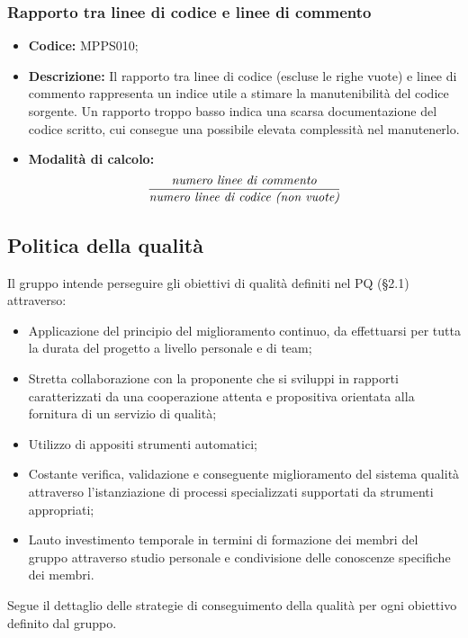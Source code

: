 \documentclass[../NormediProgetto.tex]{subfiles}
\begin{document}
\subsubsection{Rapporto tra linee di codice e linee di commento}

\begin{itemize}
	
	\item \textbf{Codice:} MPPS010;
	
	\item \textbf{Descrizione:} Il rapporto tra linee di codice (escluse le righe vuote) e linee di commento rappresenta un indice utile a stimare la manutenibilità del codice sorgente. Un rapporto troppo basso indica una scarsa documentazione del codice scritto, cui consegue una possibile elevata complessità nel manutenerlo.
	
	\item \textbf{Modalità di calcolo:}
	\[\frac{\textrm{\textit{numero linee di commento}}}{\textrm{\textit{numero linee di codice (non vuote)}}} \]
\end{itemize}

\subsection{Politica della qualità}
Il gruppo intende perseguire gli obiettivi di qualità definiti nel PQ (§2.1) attraverso:

\begin{itemize}
	\item Applicazione del principio del miglioramento continuo, da effettuarsi per tutta la durata del progetto a livello personale e di team;
	\item Stretta collaborazione con la proponente che si sviluppi in rapporti caratterizzati da una cooperazione attenta e propositiva orientata alla fornitura di un servizio di qualità;
	\item Utilizzo di appositi strumenti automatici;
	\item Costante verifica, validazione e conseguente miglioramento del sistema qualità attraverso l'istanziazione di processi specializzati supportati da strumenti appropriati;
	\item Lauto investimento temporale in termini di formazione dei membri del gruppo attraverso studio personale e condivisione delle conoscenze specifiche dei membri.
\end{itemize}

Segue il dettaglio delle strategie di conseguimento della qualità per ogni obiettivo definito dal gruppo.
\end{document}
